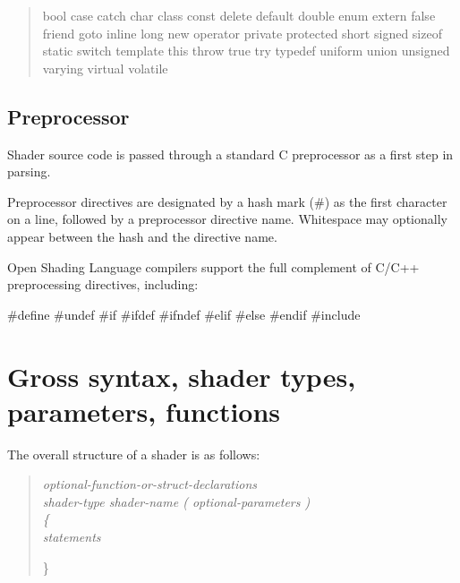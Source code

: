 \documentclass[11pt,letterpaper]{book}
\def\langname{Open Shading Language\xspace}
\begin{document}
\begin{quote} {\cf

bool case catch char class const delete default double 
enum extern false friend
goto inline long new operator private protected 
short signed sizeof static 
switch template this throw true try typedef 
uniform union unsigned varying virtual volatile

}
\end{quote}


\section{Preprocessor}
\label{sec:preprocessor}
 

Shader source code is passed through a standard C preprocessor as a
first step in parsing.  

Preprocessor directives are designated by a hash mark ({\cf \#}) as the
first character on a line, followed by a preprocessor directive name.
Whitespace may optionally appear between the hash and the directive
name.

\langname compilers support the full complement of C/C++ preprocessing
directives, including:

\begin{code}
    #define
    #undef
    #if
    #ifdef
    #ifndef
    #elif
    #else
    #endif
    #include
\end{code}



\chapter{Gross syntax, shader types, parameters, functions}
\label{chap:grosssyntax}

The overall structure of a shader is as follows:
\medskip

\begin{quote}
\em
optional-function-or-struct-declarations \\

shader-type shader-name {\cf (} optional-parameters {\cf )} \\
\rm
{\cf \{ } \\
\em
\spc statements

{\cf \} }
\end{quote}
\end{document}
